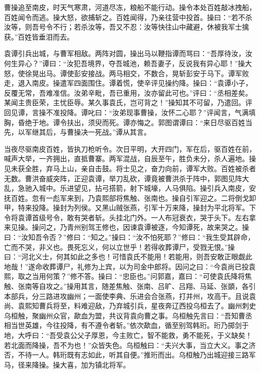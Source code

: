 曹操追至南皮，时天气寒肃，河道尽冻，粮船不能行动。操令本处百姓敲冰拽船，百姓闻令而逃。操大怒，欲捕斩之。百姓闻得，乃亲往营中投首。操曰：“若不杀汝等，则吾号令不行；若杀汝等，吾又不忍：汝等快往山中藏避，休被我军士擒获。”百姓皆垂泪而去。

袁谭引兵出城，与曹军相敌。两阵对圆，操出马以鞭指谭而骂曰：“吾厚待汝，汝何生异心？”谭曰：“汝犯吾境界，夺吾城池，赖吾妻子，反说我有异心耶！”操大怒，使徐晃出马。谭使彭安接战。两马相交，不数合，晃斩彭安于马下。谭军败走，退入南皮。操遣军四面围住。谭着慌，使辛评见操约降。操曰：“袁谭小子，反覆无常，吾难准信。汝弟辛毗，吾已重用，汝亦留此可也。”评曰：“丞相差矣。某闻主贵臣荣，主忧臣辱。某久事袁氏，岂可背之！”操知其不可留，乃遣回。评回见谭，言操不准投降。谭叱曰：“汝弟现事曹操，汝怀二心耶？”评闻言，气满填胸，昏绝于地。谭令扶出，须臾而死。谭亦悔之。郭图谓谭曰：“来日尽驱百姓当先，以军继其后，与曹操决一死战。”谭从其言。

当夜尽驱南皮百姓，皆执刀枪听令。次日平明，大开四门，军在后，驱百姓在前，喊声大举，一齐拥出，直抵曹寨。两军混战，自辰至午，胜负未分，杀人遍地。操见未获全胜，弃马上山，亲自击鼓。将士见之，奋力向前，谭军大败。百姓被杀者无数。曹洪奋威突阵，正迎袁谭，举刀乱砍，谭竟被曹洪杀于阵中，郭图见阵大乱，急驰入城中。乐进望见，拈弓搭箭，射下城壕，人马俱陷。操引兵入南皮，安抚百姓。忽有一彪军来到，乃袁熙部将焦触、张南也。操自引军迎之。二将倒戈卸甲，特来投降。操封为列侯。又黑山贼张燕，引军十万来降，操封为平北将军。下令将袁谭首级号令，敢有哭者斩。头挂北门外。一人布冠衰衣，哭于头下。左右拿来见操。操问之，乃青州别驾王修也，因谏袁谭被逐，今知谭死，故来哭之。操曰：“汝知吾令否？”修曰：“知之。”操曰：“汝不怕死耶？”修曰：“我生受其辟命，亡而不哭，非义也。畏死忘义，何以立世乎！若得收葬谭尸，受戮无恨。”操曰：“河北义士，何其如此之多也！可惜袁氏不能用！若能用，则吾安敢正眼觑此地哉！”遂命收葬谭尸，礼修为上宾，以为司金中郎将。因问之曰：“今袁尚已投袁熙，取之当用何策？”修不答。操曰：“忠臣也。”问郭嘉，嘉曰：“可使袁氏降将焦触、张南等自攻之。”操用其言，随差焦触、张南、吕旷、吕翔、马延、张顗，各引本部兵，分三路进攻幽州；一面使李典、乐进会合张燕，打并州，攻高干。且说袁尚、袁熙知曹兵将至，料难迎敌，乃弃城引兵，星夜奔辽西投乌桓去了。幽州刺史乌桓触，聚幽州众官，歃血为盟，共议背袁向曹之事。乌桓触先言曰：“吾知曹丞相当世英雄，今往投降，有不遵令者斩。”依次歃血，循至别驾韩珩。珩乃掷剑于地，大呼曰：“吾受袁公父子厚恩，今主败亡，智不能救，勇不能死，于义缺矣！若北面而降操，吾不为也！”众皆失色。乌桓触曰：“夫兴大事，当立大义。事之济否，不待一人。韩珩既有志如此，听其自便。”推珩而出。乌桓触乃出城迎接三路军马，径来降操。操大喜，加为镇北将军。

